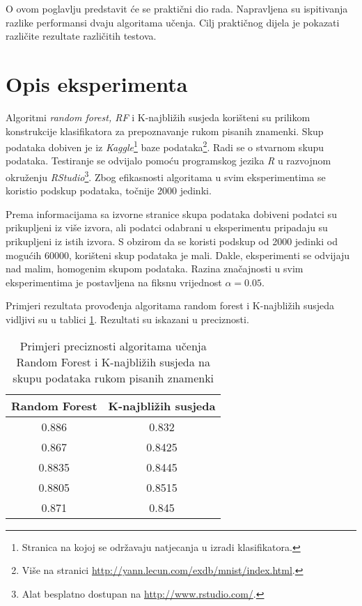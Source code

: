 O ovom poglavlju predstavit će se praktični dio rada. Napravljena su ispitivanja razlike performansi dvaju algoritama učenja. Cilj praktičnog dijela je pokazati različite rezultate različitih testova.

\section{Opis eksperimenta}

Algoritmi \textit{random forest, RF} \citep{breiman2001random} i K-najbližih susjeda  \citep{fukunaga1975branch} korišteni su prilikom konstrukcije klasifikatora za prepoznavanje rukom pisanih znamenki. Skup podataka dobiven je iz \textit{Kaggle}\footnote{Stranica na kojoj se održavaju natjecanja u izradi klasifikatora.} baze podataka\footnote{Više na stranici \url{http://yann.lecun.com/exdb/mnist/index.html}.}. Radi se o stvarnom skupu podataka. 
Testiranje se odvijalo pomoću programskog jezika \textit{R} u razvojnom okruženju \textit{RStudio}\footnote{Alat besplatno dostupan na \url{http://www.rstudio.com/}.}. Zbog efikasnosti algoritama u svim eksperimentima se koristio podskup podataka, točnije 2000 jedinki.

Prema informacijama sa izvorne stranice skupa podataka dobiveni podatci su prikupljeni iz više izvora, ali podatci odabrani u eksperimentu pripadaju su prikupljeni iz istih izvora. S obzirom da se koristi podskup od 2000 jedinki od mogućih 60000, korišteni skup podataka je mali. Dakle, eksperimenti se odvijaju nad malim, homogenim skupom podataka. Razina značajnosti u svim eksperimentima je postavljena na fiksnu vrijednost $\alpha=0.05$. 

Primjeri rezultata provođenja algoritama random forest i K-najbližih susjeda vidljivi su u tablici \ref{tab:perfomance_example}. Rezultati su iskazani u preciznosti.
\begin{center}

\begin{table}
\small
\centering
\begin{tabular}{|c|c|}
\hline
Random Forest & K-najbližih susjeda \\ \hline
0.886 & 0.832 \\ \hline
0.867 & 0.8425 \\ \hline
0.8835 & 0.8445 \\ \hline
0.8805 & 0.8515 \\ \hline
0.871 & 0.845 \\ \hline
\end{tabular}
\caption{Primjeri preciznosti algoritama učenja Random Forest i K-najbližih susjeda na skupu podataka rukom pisanih znamenki}
\label{tab:perfomance_example}
\end{table}
\end{center}

